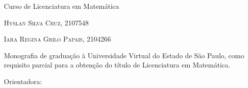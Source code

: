 \documentclass[12pt, a4paper,
 chapter=TITLE,
  section=TITLE,
   subsection=TITLE,
    subsubsection=TITLE]{abntex2}
\begin{document}
	
	\begin{center}
		{\ABNTEXchapterfont\large\textsc{\imprimirinstituicao}}
		\vspace{0.5cm} %
		
		{\ABNTEXchapterfont\large{Curso de Licenciatura em Matemática}\par}
		\vspace{3cm} %
		
		{\ABNTEXchapterfont\bfseries\Large\imprimirtitulo}
		\vspace{0.5cm} %
		
		\begin{center}
			\vfill %
			\vfill %
		\end{center}
		
		\vspace{1cm} %
		
		{\ABNTEXchapterfont\large\textsc{\imprimirlocal}}
		
		{\ABNTEXchapterfont\large\textsc{\imprimirdata}}
		
	\end{center}
	
	\clearpage
	
	
\begin{center}
	{\ABNTEXchapterfont\large\textsc{\imprimirinstituicao}}
	\vspace*{\fill}
	
	{\ABNTEXchapterfont\bfseries\Large\imprimirtitulo}
	\vspace*{\fill}
	
	
	\vspace*{\fill}
	
	{\ABNTEXchapterfont\large\textsc{Hyslan Silva Cruz, 2107548}}
	
	{\ABNTEXchapterfont\large\textsc{Iara Regina Grilo Papais, 2104266}}
	
	\vspace*{\fill}
	
	\begin{flushright}
		\begin{minipage}{0.5\textwidth}
			Monografia de graduação à Universidade Virtual do Estado de São Paulo, como requisito parcial para a obtenção do título de Licenciatura em Matemática.
			
			Orientadora: \imprimirorientador
		\end{minipage}
	\end{flushright}
	
	\vspace*{\fill}
	
	{\ABNTEXchapterfont\large\textsc{\imprimirlocal}}
	
	{\ABNTEXchapterfont\large\textsc{\imprimirdata}}
	
\end{center}
	
\end{document}
